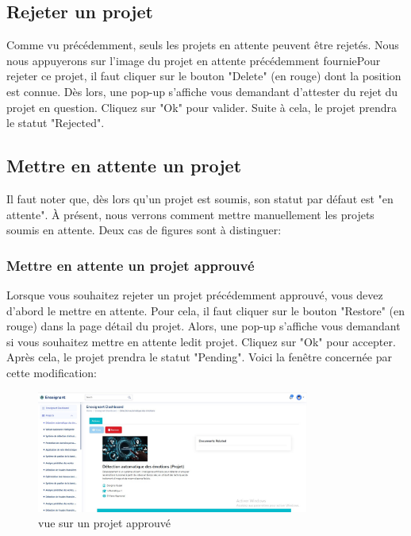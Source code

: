 \documentclass[12pt]{article}
\begin{document}
\subsection{Rejeter un projet}
Comme vu précédemment, seuls les projets en attente peuvent être rejetés. Nous nous appuyerons sur l'image du projet en attente précédemment fourniePour rejeter ce projet, il faut cliquer sur le bouton "Delete" (en rouge) dont la position est connue. Dès lors, une pop-up s'affiche vous demandant d'attester du rejet du projet en question. Cliquez sur "Ok" pour valider. Suite à cela, le projet prendra le statut "Rejected".  

\medskip
\subsection{Mettre en attente un projet}
Il faut noter que, dès lors qu'un projet est soumis, son statut par défaut est "en attente". À présent, nous verrons comment mettre manuellement les projets soumis en attente. Deux cas de figures sont à distinguer:

\subsubsection{Mettre en attente un projet approuvé}
Lorsque vous souhaitez rejeter un projet précédemment approuvé, vous devez d'abord le mettre en attente. Pour cela, il faut cliquer sur le bouton "Restore" (en rouge) dans la page détail du projet. Alors, une pop-up s'affiche vous demandant si vous souhaitez mettre en attente ledit projet. Cliquez sur "Ok" pour accepter. Après cela, le projet prendra le statut "Pending". Voici la fenêtre concernée par cette modification:
        \begin{figure}[h!]
            \centering
            \includegraphics[width=0.8\textwidth]{images/approved.jpg}
            \caption{vue sur un projet approuvé}
            \label{vue sur un projet approuvé}
        \end{figure}
\end{document}

